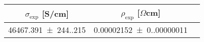 \begin{tabular}{ccc}
\toprule
$\sigma_{\exp}$ [S/cm] & $\rho_{\exp}$ [$\Omega$cm] \\
\midrule
\num{46467.391(244.215)} & \num{0.00002152(0.00000011)} \\
\bottomrule
\end{tabular}
